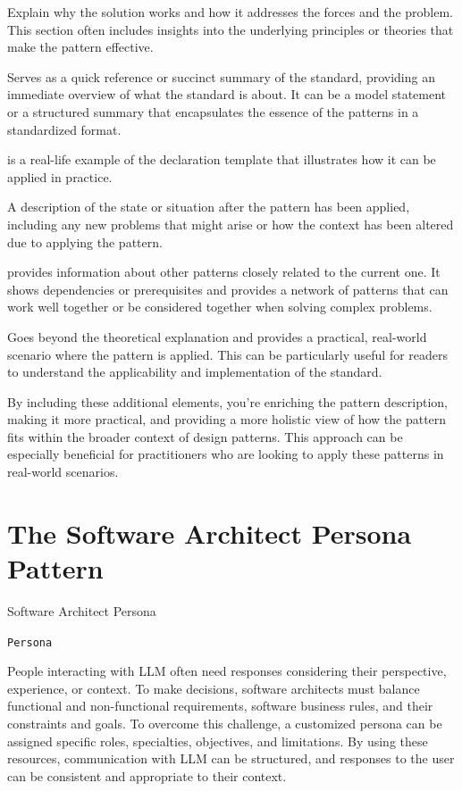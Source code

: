  Explain why the solution works and how it addresses the forces and the problem. This section often includes insights into the underlying principles or theories that make the pattern effective.

 Serves as a quick reference or succinct summary of the standard, providing an immediate overview of what the standard is about. It can be a model statement or a structured summary that encapsulates the essence of the patterns in a standardized format.

 is a real-life example of the declaration template that illustrates how it can be applied in practice.

 A description of the state or situation after the pattern has been applied, including any new problems that might arise or how the context has been altered due to applying the pattern.

 provides information about other patterns closely related to the current one. It shows dependencies or prerequisites and provides a network of patterns that can work well together or be considered together when solving complex problems.

 Goes beyond the theoretical explanation and provides a practical, real-world scenario where the pattern is applied. This can be particularly useful for readers to understand the applicability and implementation of the standard.

By including these additional elements, you're enriching the pattern description, making it more practical, and providing a more holistic view of how the pattern fits within the broader context of design patterns. This approach can be especially beneficial for practitioners who are looking to apply these patterns in real-world scenarios.


\section{The Software Architect Persona Pattern} \label{sec:software-architect-persona}

 Software Architect Persona

\texttt{Persona}

 People interacting with LLM often need responses considering their perspective, experience, or context. To make decisions, software architects must balance functional and non-functional requirements, software business rules, and their constraints and goals. To overcome this challenge, a customized persona can be assigned specific roles, specialties, objectives, and limitations. By using these resources, communication with LLM can be structured, and responses to the user can be consistent and appropriate to their context.

